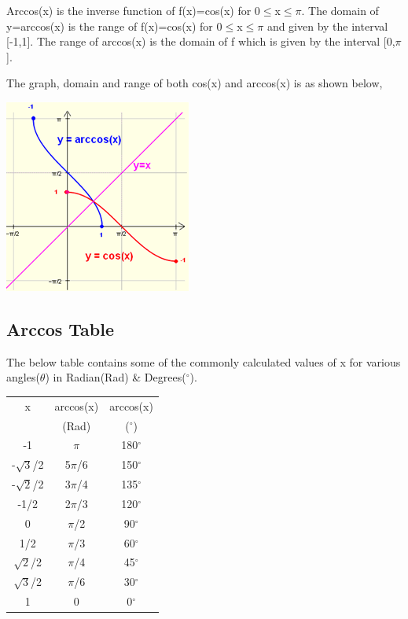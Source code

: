 \documentclass[12pt]{report}
\begin{document}
		Arccos(x) is the inverse function of f(x)=cos(x) for 0$\leq$x$\leq$$\pi$. The domain of y=arccos(x) is the range of f(x)=cos(x) for 0$\leq$x$\leq$$\pi$ and given by the interval [-1,1]. The range of arccos(x) is the domain of f which is given by the interval [0,$\pi$].\par
		The graph, domain and range of both cos(x) and arccos(x) is as shown below,
		\begin{center}
			\includegraphics[width=0.35\columnwidth]{pic2.png}
		\end{center}
\pagebreak	
	\subsection{Arccos Table}
The below table contains some of the commonly calculated values of	x for various angles($\theta$) in Radian(Rad) \& Degrees($^{\circ}$).
	\begin{center}
		\begin{tabular}{c|c|c}
			\hline
			x&arccos(x)&arccos(x)\\
			 &(Rad)&($^{\circ}$)\\
			 \hline
			 -1&$\pi$&180$^{\circ}$\\
			 \hline
			 -$\sqrt{3}$/2&5$\pi$/6&150$^{\circ}$\\
			 \hline
			 -$\sqrt{2}$/2&3$\pi$/4&135$^{\circ}$\\
			 \hline
			 -1/2&2$\pi$/3&120$^{\circ}$\\
			 \hline
			 0&$\pi$/2&90$^{\circ}$\\
			 \hline
			1/2&$\pi$/3&60$^{\circ}$\\
			 \hline
			 $\sqrt{2}$/2&$\pi$/4&45$^{\circ}$\\
			 \hline
			 $\sqrt{3}$/2&$\pi$/6&30$^{\circ}$\\
			 \hline
			 1&0&0$^{\circ}$\\
			 \hline
		\end{tabular}
	\end{center}
	
\end{document}
